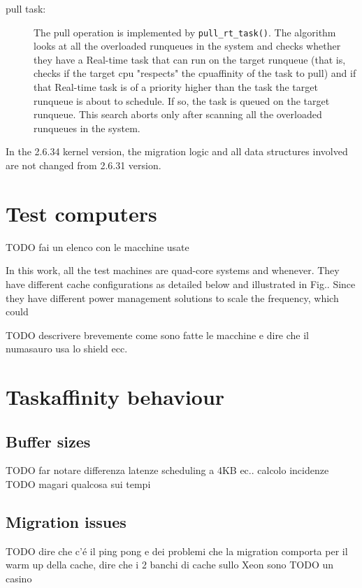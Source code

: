 \begin{description}
\item[pull task:] The pull operation is implemented by \texttt{pull\_rt\_task()}. The algorithm looks at all the overloaded runqueues in the system 
and checks whether they have a Real-time task that can run on the target runqueue (that is, checks if the target cpu "respects" the cpuaffinity of the 
task to pull) and if that Real-time task is of a priority higher than the task the target runqueue is about to schedule. If so, the task is queued on 
the target runqueue. This search aborts only after scanning all the overloaded runqueues in the system. 

\end{description}

In the 2.6.34 kernel version, the migration logic and all data structures involved are not changed from 2.6.31 version.

\section{Test computers}

TODO fai un elenco con le macchine usate

In this work, all the test machines are quad-core 
systems and whenever. They have different cache configurations
as detailed below and illustrated in Fig.. Since they have different
power management solutions to scale the frequency, which could

TODO descrivere brevemente come sono fatte le macchine e dire che il numasauro usa lo shield ecc.

\section{Taskaffinity behaviour}

\subsection{Buffer sizes}

TODO far notare differenza latenze scheduling a 4KB ec.. calcolo incidenze
TODO magari qualcosa sui tempi 

\subsection{Migration issues}
TODO dire che c'\'e il ping pong e dei problemi che la migration comporta per il warm up della cache, dire che i 2 banchi di cache sullo Xeon sono
TODO un casino

